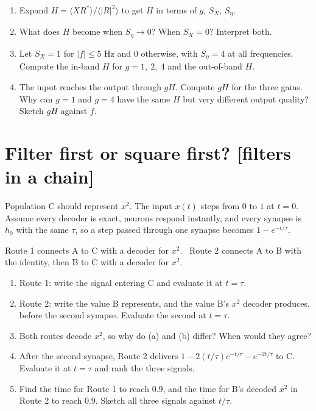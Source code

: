 \documentclass[11pt,letterpaper]{article}
\begin{document}
\begin{enumerate}
\item Expand $H = \langle X R^* \rangle / \langle |R|^2 \rangle$ to get $H$ in terms of $g$, $S_X$, $S_\eta$.
\item What does $H$ become when $S_\eta \to 0$? When $S_X = 0$? Interpret both.
\item Let $S_X = 1$ for $|f| \le 5$ Hz and $0$ otherwise, with $S_\eta = 4$ at all frequencies. Compute the in-band $H$ for $g = 1,\ 2,\ 4$ and the out-of-band $H$.
\item The input reaches the output through $gH$. Compute $gH$ for the three gains. Why can $g = 1$ and $g = 4$ have the same $H$ but very different output quality? Sketch $gH$ against $f$.
\end{enumerate}

\section{Filter first or square first? \hfill [filters in a chain]}

Population C should represent $x^2$. The input $x(t)$ steps from $0$ to $1$ at $t = 0$. Assume every decoder is exact, neurons respond instantly, and every synapse is $h_0$ with the same $\tau$, so a step passed through one synapse becomes $1 - e^{-t/\tau}$.

Route 1 connects A to C with a decoder for $x^2$. \
Route 2 connects A to B with the identity, then B to C with a decoder for $x^2$.

\begin{enumerate}
\item Route 1: write the signal entering C and evaluate it at $t = \tau$.
\item Route 2: write the value B represents, and the value B's $x^2$ decoder produces, before the second synapse. Evaluate the second at $t = \tau$.
\item Both routes decode $x^2$, so why do (a) and (b) differ? When would they agree?
\item After the second synapse, Route 2 delivers $1 - 2(t/\tau) e^{-t/\tau} - e^{-2t/\tau}$ to C. Evaluate it at $t = \tau$ and rank the three signals.
\item Find the time for Route 1 to reach $0.9$, and the time for B's decoded $x^2$ in Route 2 to reach $0.9$. Sketch all three signals against $t/\tau$.
\end{enumerate}
\end{document}
